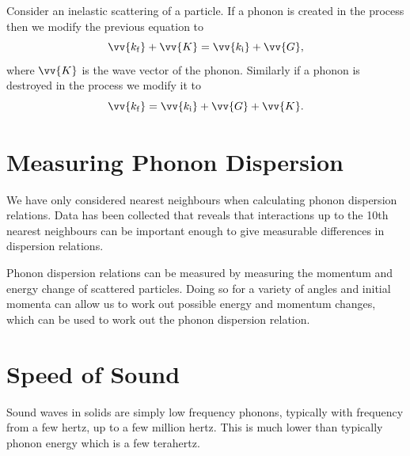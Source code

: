 \documentclass[fleqn]{NotesClass}
\begin{document}
    Consider an inelastic scattering of a particle.
    If a phonon is created in the process then we modify the previous equation to
    \begin{equation}
        \vv{k_{\mathrm{f}}} + \vv{K} = \vv{k_{\mathrm{i}}} + \vv{G},
    \end{equation}
    where \(\vv{K}\) is the wave vector of the phonon.
    Similarly if a phonon is destroyed in the process we modify it to
    \begin{equation}
        \vv{k_{\mathrm{f}}} = \vv{k_{\mathrm{i}}} + \vv{G} + \vv{K}.
    \end{equation}
    
    \section{Measuring Phonon Dispersion}
    We have only considered nearest neighbours when calculating phonon dispersion relations.
    Data has been collected that reveals that interactions up to the 10th nearest neighbours can be important enough to give measurable differences in dispersion relations.
    
    Phonon dispersion relations can be measured by measuring the momentum and energy change of scattered particles.
    Doing so for a variety of angles and initial momenta can allow us to work out possible energy and momentum changes, which can be used to work out the phonon dispersion relation.
    
    \section{Speed of Sound}
    Sound waves in solids are simply low frequency phonons, typically with frequency from a few hertz, up to a few million hertz.
    This is much lower than typically phonon energy which is a few terahertz.
    
\end{document}
